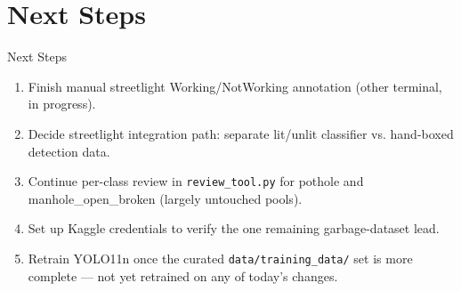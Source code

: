 \documentclass[10pt]{beamer}
\begin{document}
\section{Next Steps}
\begin{frame}{Next Steps}
  \begin{enumerate}
    \item Finish manual streetlight Working/NotWorking annotation (other terminal, in progress).
    \item Decide streetlight integration path: separate lit/unlit classifier vs.
      hand-boxed detection data.
    \item Continue per-class review in \texttt{review\_tool.py} for pothole and
      manhole\_open\_broken (largely untouched pools).
    \item Set up Kaggle credentials to verify the one remaining garbage-dataset lead.
    \item Retrain YOLO11n once the curated \texttt{data/training\_data/} set is more complete
      — not yet retrained on any of today's changes.
  \end{enumerate}
\end{frame}
\end{document}
